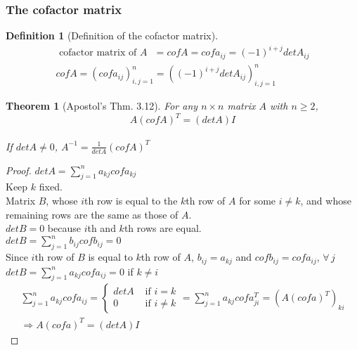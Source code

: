 \documentclass[twoside]{amsart}
\theoremstyle{plain}
\newtheorem{theorem}{Theorem}
\theoremstyle{definition}
\newtheorem{definition}{Definition}
\begin{document}
\subsubsection{The cofactor matrix}
\begin{definition}[Definition of the cofactor matrix]
 \begin{gather}
   \text{ cofactor matrix of $A$ } = cof{A} = cof{a_{ij}} = (-1)^{i+j} det{A_{ij}} \\
   cof{A} = (cof{a_{ij}})_{i,j=1}^n = ((-1)^{i+j} det{A_{ij}})_{i,j=1}^n 
\end{gather}
\end{definition}

\begin{theorem}[Apostol's Thm. 3.12] For any $n\times n$ matrix $A$ with $n\geq 2$,
  \begin{equation}
    A (cof{A})^T = (det{A}) I 
  \end{equation} \\
  If $det{A} \neq 0$, $A^{-1} = \frac{1}{det{A}} (cof{A})^T$
\end{theorem}

\begin{proof}
$  det{A} = \sum_{j=1}^n a_{kj} cof{a_{kj}}$ \\
Keep $k$ fixed.  \\
Matrix $B$, whose $i$th row is equal to the $k$th row of $A$ for some $i\neq k$, and whose remaining rows are the same as those of $A$.   \\
$det{B} =0$ because $i$th and $k$th rows are equal.  \\
$det{B} = \sum_{j=1}^n b_{ij} cof{b_{ij}} = 0$ \\
Since $i$th row of $B$ is equal to $k$th row of $A$, $b_{ij} = a_{kj}$ and $cof{b_{ij}} = cof{a_{ij}}$, $\forall \, j$ \\
$det{B} = \sum_{j=1}^n a_{kj} cof{a_{ij}} =0 $ if $k\neq i$
\[
\begin{gathered}
\sum_{j=1}^n a_{kj} cof{a_{ij}} = \begin{cases} det{A} & \text{ if } i = k \\ 0 & \text{ if } i \neq k \end{cases} = \sum_{j=1}^n a_{kj} cof{a_{ji}^T } = (A(cof{a})^T)_{ki} \\
\Longrightarrow A(cof{a})^T = (det{A}) I
\end{gathered}
\]
\end{proof}
\end{document}
